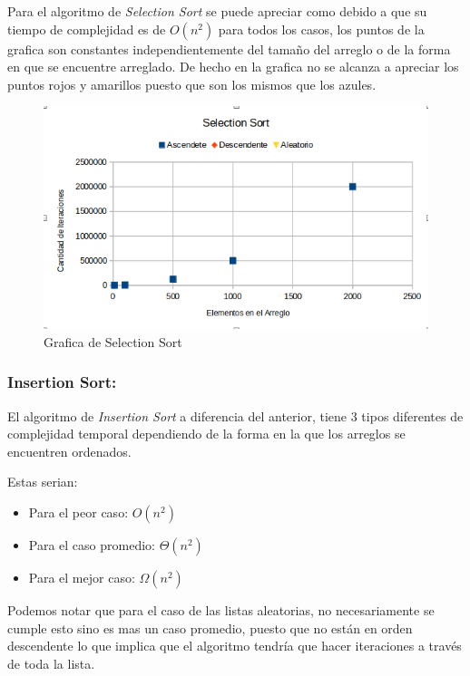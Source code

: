 \documentclass{article}
\begin{document}
			Para el algoritmo de \emph{Selection Sort} se puede apreciar como debido a que su tiempo de complejidad es de $O(n^2)$ para todos los casos, los puntos de la grafica son constantes independientemente del tamaño del arreglo o de la forma en que se encuentre arreglado. De hecho en la grafica no se alcanza a apreciar los puntos rojos y amarillos puesto que son los mismos que los azules.
			
			\begin{figure}[H]
				\centering
				\includegraphics[scale = 0.65]{images/selection-graph}
				\caption{Grafica de Selection Sort}
			\end{figure}
			\newpage
		
		
			\subsubsection{Insertion Sort:}
			
			El algoritmo de \emph{Insertion Sort} a diferencia del anterior, tiene 3 tipos diferentes de complejidad temporal dependiendo de la forma en la que los arreglos se encuentren ordenados.
			
			\noindent Estas serian:
			
			\begin{itemize}
				\item Para el peor caso: $O(n^2)$
				\item Para el caso promedio: $\Theta(n^2)$
				\item Para el mejor caso: $\Omega(n^2)$ 
			\end{itemize}
	
			Podemos notar que para el caso de las listas aleatorias, no necesariamente se cumple esto sino es mas un caso promedio, puesto que no están en orden descendente lo que implica que el algoritmo tendría que hacer iteraciones a través de toda la lista.
	
\end{document}

